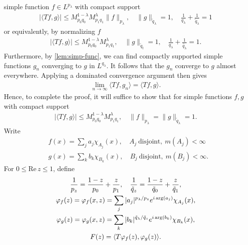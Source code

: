 simple function $f \in L^{p_\lambda}$ with compact support
%
%
\begin{equation*}
\begin{split}
| \langle Tf, g \rangle |  \le M_{p_0q_0}^{1-\lambda}M_{p_1q_1}^{\lambda}
\|f\|_{p_\lambda},
\quad \|g\|_{\tilde{q}_{\lambda}} =1, \quad \frac{1}{q_{\lambda}} +
\frac{1}{\tilde{q}_{\lambda}} =1
\end{split}
\end{equation*}
%
%
or equivalently, by normalizing $f$
%
%
\begin{equation*}
\begin{split}
| \langle Tf, g \rangle |  \le M_{p_0q_0}^{1-\lambda}M_{p_1q_1}^{\lambda},
\quad \|g\|_{\tilde{q}_{t}} =1, \quad \frac{1}{q_{\lambda}} +
\frac{1}{\tilde{q_{\lambda}}} =1.
\end{split}
\end{equation*}
%
%
Furthermore, by \autoref{lem:simp-func}, we can find compactly supported simple
functions $g_n$ converging to $g$ in $L^{q_{\lambda}}$.
It follows that the $g_n$ converge to $g$ almost everywhere.
Applying a dominated convergence
argument then gives
%
%
\begin{equation*}
\begin{split}
\lim_{n \to \infty}  \langle Tf, g_n \rangle
= \langle Tf, g \rangle.
\end{split}
\end{equation*}
%
%
Hence, to complete the proof, it will suffice to show that for simple functions
$f, g$ with compact support
%
%
\begin{equation}
\label{duality-relation}
\begin{split}
|\langle Tf, g \rangle | \le M_{p_0 q_0}^{1- \lambda} M_{p_1 q_1}^{\lambda},
\quad \| f \|_{p_\lambda} = \| g \|_{\tilde{q}_\lambda} =1.
\end{split}
\end{equation}
%
%
Write
%
%
\begin{equation*}
\begin{split}
	& f(x) = \sum_j a_j \chi_{A_j}(x), \quad A_j \ \text{disjoint}, \ m(A_j) <
	\infty
	\\
	& g(x) = \sum_{k}b_{k} \chi_{B_k}(x), \quad B_j \ \text{disjoint}, \ m(B_j) <
	\infty.
\end{split}
\end{equation*}
%
%
For $0 \le \text{Re}\, z
\le 1$, define
%
%
\begin{gather*}
\frac{1}{p_z} = \frac{1-z}{p_0} + \frac{z}{p_1}
,\quad \frac{1}{\tilde{q}_z} =
\frac{1-z}{\tilde{q}_0} + \frac{z}{\tilde{q}_1},
\\
\varphi_{f}(z) = \varphi_{f}(x, z) = \sum_{j} | a_j |^{p_\lambda / p_z} e^{i
\arg(a_j)} \chi_{A_j}(x),
\\
\varphi_{g}(z) = \varphi_{g}(x, z) = \sum_{k} | b_k |^{\tilde{q}_\lambda / \tilde{q}_z} e^{i
\arg(b_k)} \chi_{B_k}(x),
\\
F(z) = \langle T\varphi_{f}(z), \varphi_{g}(z) \rangle.
\end{gather*}
